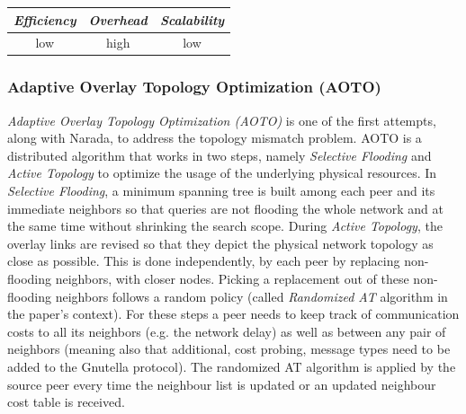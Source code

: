 \begin{center}
\begin{tabular}{ccc}
\emph{Efficiency} & \emph{Overhead} & \emph{Scalability} \\
\hline
%
low &
high &
%
low
\end{tabular}
\end{center}

\subsubsection{Adaptive Overlay Topology Optimization (AOTO)}
\emph{Adaptive Overlay Topology Optimization (AOTO)} \cite{LZXN2003} is one
of the first attempts, along with Narada, to address the topology mismatch
problem. AOTO is a distributed algorithm that works in two steps, namely
\emph{Selective Flooding} and \emph{Active Topology} to optimize the usage of
the underlying physical resources. In \emph{Selective Flooding}, a minimum
spanning tree is built among each peer and its immediate neighbors so that
queries are not flooding the whole network and at the same time without
shrinking the search scope. During \emph{Active Topology}, the overlay
links are revised so that they depict the physical network topology as close as
possible. This is done independently, by each peer by replacing non-flooding
neighbors, with closer nodes. Picking a replacement out of these non-flooding
neighbors follows a random policy (called \emph{Randomized AT} algorithm in the
paper's context). For these steps a peer needs to keep track of communication
costs to all its neighbors (e.g. the network delay) as well as between any
pair of neighbors (meaning also that additional, cost probing, message types
need to be added to the Gnutella protocol). The randomized AT algorithm is
applied by the source peer every time the neighbour list is updated or an updated
neighbour cost table is received.


